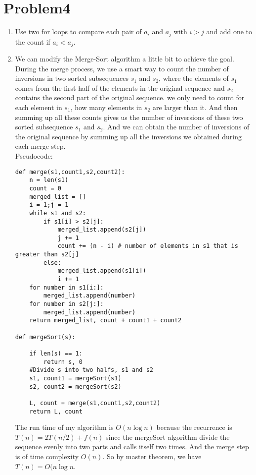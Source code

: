\documentclass{article}
\begin{document}
\section{Problem4}
\begin{enumerate}
\item Use two for loops to compare each pair of $a_i$ and $a_j$ with $i > j$ and add one to the count if $a_i < a_j$.
\item We can modify the Merge-Sort algorithm a little bit to achieve the goal. During the merge process, we use a smart way to count the number of inversions in two sorted subsequences $s_1$ and $s_2$, where the elements of $s_1$ comes from the first half of the elements in the original sequence and $s_2$ contains the second part of the original sequence. we only need to count for each element in $s_1$, how many elements in $s_2$ are larger than it. And then summing up all these counts gives us the number of inversions of these two sorted subsequence $s_1$ and $s_2$. And we can obtain the number of inversions of the original sequence by summing up all the inversions we obtained during each merge step. \\

Pseudocode:
\begin{lstlisting}
def merge(s1,count1,s2,count2):
    n = len(s1)
    count = 0
    merged_list = []
    i = 1;j = 1
    while s1 and s2:
        if s1[i] > s2[j]:
            merged_list.append(s2[j])
            j += 1
            count += (n - i) # number of elements in s1 that is greater than s2[j]
        else:
            merged_list.append(s1[i])
            i += 1
    for number in s1[i:]:
        merged_list.append(number)
    for number in s2[j:]:
        merged_list.append(number)
    return merged_list, count + count1 + count2

def mergeSort(s):

    if len(s) == 1:
        return s, 0
    #Divide s into two halfs, s1 and s2
    s1, count1 = mergeSort(s1)
    s2, count2 = mergeSort(s2)

    L, count = merge(s1,count1,s2,count2)
    return L, count
\end{lstlisting}

The run time of my algorithm is $O(n\log n)$ because the recurrence is $T(n) = 2T(n/2) + f(n)$ since the mergeSort algorithm divide the sequence evenly into two parts and calls itself two times. And the merge step is of time complexity $O(n)$. So by master theorem, we have $T(n) = O(n\log n$.


\end{enumerate}
\end{document}
